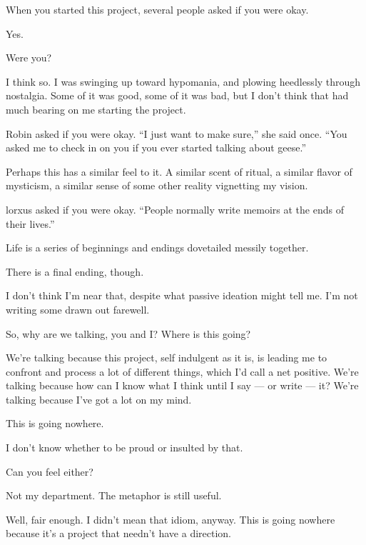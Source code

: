 \label{ally:21}
\begin{paracol}{2}
  \begin{leftcolumn}

\begin{ally}
When you started this project, several people asked if you were okay.
\end{ally}
Yes.

\begin{ally}
Were you?
\end{ally}
I think so. I was swinging up toward hypomania, and plowing heedlessly through nostalgia. Some of it was good, some of it was bad, but I don't think that had much bearing on me starting the project.

\begin{ally}
Robin asked if you were okay. ``I just want to make sure,'' she said once. ``You asked me to check in on you if you ever started talking about geese.''
\end{ally}
Perhaps this has a similar feel to it. A similar scent of ritual, a similar flavor of mysticism, a similar sense of some other reality vignetting my vision.

\begin{ally}
lorxus asked if you were okay. ``People normally write memoirs at the ends of their lives.''
\end{ally}
Life is a series of beginnings and endings dovetailed messily together.

\begin{ally}
There is a final ending, though.
\end{ally}
I don't think I'm near that, despite what passive ideation might tell me. I'm not writing some drawn out farewell.

\begin{ally}
So, why are we talking, you and I? Where is this going?
\end{ally}
We're talking because this project, self indulgent as it is, is leading me to confront and process a lot of different things, which I'd call a net positive. We're talking because how can I know what I think until I say --- or write --- it? We're talking because I've got a lot on my mind.

This is going nowhere.

\begin{ally}
I don't know whether to be proud or insulted by that.
\end{ally}
Can you feel either?

\begin{ally}
Not my department. The metaphor is still useful.
\end{ally}
Well, fair enough. I didn't mean that idiom, anyway. This is going nowhere because it's a project that needn't have a direction.


\end{leftcolumn}
\end{paracol}
